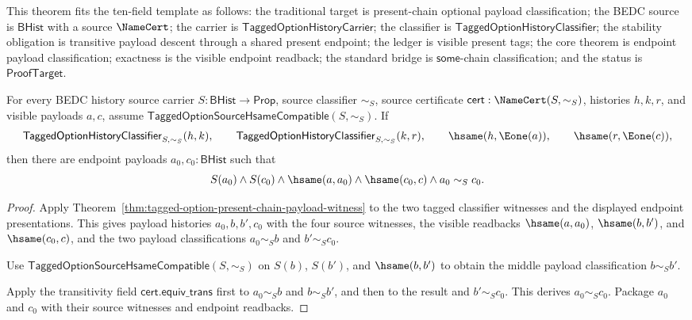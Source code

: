 \begin{theorem}
\label{thm:tagged-option-present-chain-endpoint-classification}
This theorem fits the ten-field template as follows: the traditional target is
present-chain optional payload classification; the BEDC source is
$\mathsf{BHist}$ with a source $\NameCert$; the carrier is
$\mathsf{TaggedOptionHistoryCarrier}$; the classifier is
$\mathsf{TaggedOptionHistoryClassifier}$; the stability obligation is transitive
payload descent through a shared present endpoint; the ledger is visible present
tags; the core theorem is endpoint payload classification; exactness is the
visible endpoint readback; the standard bridge is $\mathsf{some}$-chain
classification; and the status is $\mathsf{ProofTarget}$.

For every BEDC history source carrier $S:\mathsf{BHist}\to\mathsf{Prop}$,
source classifier $\sim_S$, source certificate
$\mathsf{cert}:\NameCert(S,\sim_S)$, histories $h,k,r$, and visible payloads
$a,c$, assume $\mathsf{TaggedOptionSourceHsameCompatible}(S,\sim_S)$. If
$$
\mathsf{TaggedOptionHistoryClassifier}_{S,\sim_S}(h,k),\qquad
\mathsf{TaggedOptionHistoryClassifier}_{S,\sim_S}(k,r),\qquad
\hsame(h,\Eone(a)),\qquad
\hsame(r,\Eone(c)),
$$
then there are endpoint payloads $a_0,c_0:\mathsf{BHist}$ such that
$$
S(a_0)\land S(c_0)\land
\hsame(a,a_0)\land \hsame(c_0,c)\land a_0\sim_S c_0.
$$
\end{theorem}
\begin{proof}
Apply Theorem~\ref{thm:tagged-option-present-chain-payload-witness} to the two
tagged classifier witnesses and the displayed endpoint presentations. This gives
payload histories $a_0,b,b',c_0$ with the four source witnesses, the visible
readbacks $\hsame(a,a_0)$, $\hsame(b,b')$, and $\hsame(c_0,c)$, and the two
payload classifications $a_0\sim_S b$ and $b'\sim_S c_0$.

Use $\mathsf{TaggedOptionSourceHsameCompatible}(S,\sim_S)$ on $S(b)$, $S(b')$,
and $\hsame(b,b')$ to obtain the middle payload classification $b\sim_S b'$.

Apply the transitivity field $\mathsf{cert.equiv\_trans}$ first to
$a_0\sim_S b$ and $b\sim_S b'$, and then to the result and $b'\sim_S c_0$.
This derives $a_0\sim_S c_0$. Package $a_0$ and $c_0$ with their source
witnesses and endpoint readbacks.
\end{proof}

